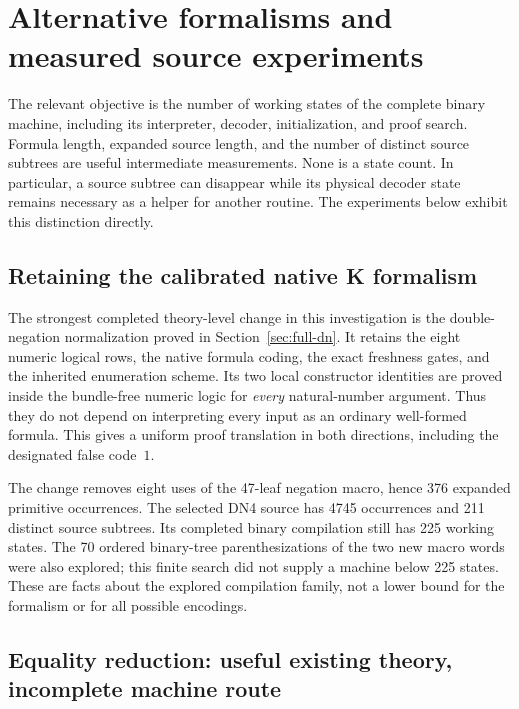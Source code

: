 \section{Alternative formalisms and measured source experiments}
\label{sec:theory-alternatives}

The relevant objective is the number of working states of the complete
binary machine, including its interpreter, decoder, initialization, and
proof search.  Formula length, expanded source length, and the number of
distinct source subtrees are useful intermediate measurements.  None is
a state count.  In particular, a source subtree can disappear while its
physical decoder state remains necessary as a helper for another routine.
The experiments below exhibit this distinction directly.

\subsection{Retaining the calibrated native K formalism}

The strongest completed theory-level change in this investigation is the
double-negation normalization proved in Section~\ref{sec:full-dn}.
It retains the eight numeric logical rows, the native formula coding,
the exact freshness gates, and the inherited enumeration scheme.  Its
two local constructor identities are proved inside the bundle-free
numeric logic for \emph{every} natural-number argument.  Thus they do
not depend on interpreting every input as an ordinary well-formed formula.
This gives a uniform proof translation in both directions, including
the designated false code~$1$.

The change removes eight uses of the 47-leaf negation macro, hence 376
expanded primitive occurrences.  The selected DN4 source has 4745
occurrences and 211 distinct source subtrees.  Its completed binary
compilation still has 225 working states.  The 70 ordered binary-tree
parenthesizations of the two new macro words were also explored; this
finite search did not supply a machine below 225 states.  These are
facts about the explored compilation family, not a lower bound for the
formalism or for all possible encodings.

\subsection{Equality reduction: useful existing theory, incomplete machine route}


